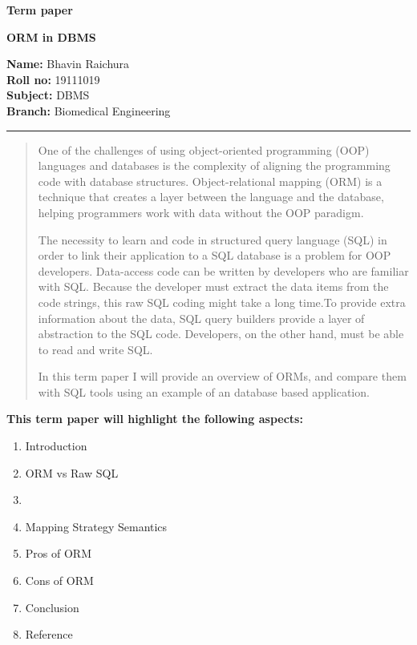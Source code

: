 \documentclass[10pt,a4paper,twoside]{article}
\begin{document}
\begin{center}
\vspace{.3cm}
{\bf {\huge Term paper}}
\item
{\bf {\huge ORM in DBMS}}
\vspace{.3cm}
\end{center}
{\bf Name:} Bhavin Raichura\\
{\bf Roll no:} 19111019 \\
{\bf Subject:} DBMS\\
{\bf Branch:} Biomedical Engineering \hspace{\fill}   \\
\hrule

\vspace{.5cm}
\vspace{.4cm}

\renewcommand{\abstractname}{Abstract}

\begin{abstract}
\item One of the challenges of using object-oriented programming (OOP) languages and databases is the complexity of aligning the programming code with database structures. Object-relational mapping (ORM) is a technique that creates a layer between the language and the database, helping programmers work with data without the OOP paradigm.
\item The necessity to learn and code in structured query language (SQL) in order to link their application to a SQL database is a problem for OOP developers.
Data-access code can be written by developers who are familiar with SQL.
Because the developer must extract the data items from the code strings, this raw SQL coding might take a long time.To provide extra information about the data, SQL query builders provide a layer of abstraction to the SQL code. Developers, on the other hand, must be able to read and write SQL.
\item In this term paper I will provide an overview of ORMs, and compare them with SQL tools using an example of an database based application.
\end{abstract}

\item
\item
{\bf {\Large This term paper will highlight the following aspects: }}\\
\begin{itemize}
\end{itemize}
\item 
\begin{enumerate}
\item Introduction
\item ORM vs Raw SQL
\item
\item Mapping Strategy Semantics
\item Pros of ORM
\item Cons of ORM
\item Conclusion
\item Reference 
\end{enumerate}
\end{document}
